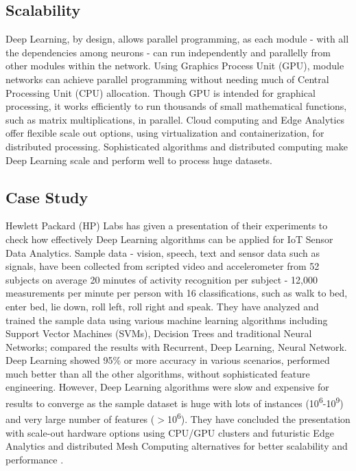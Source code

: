 \documentclass[sigconf]{acmart}
\begin{document}
	\subsection{Scalability}
	
	Deep Learning, by design, allows parallel programming, as each module - with all the dependencies among neurons - can run independently and parallelly from other modules within the network. Using Graphics Process Unit (GPU), module networks can achieve parallel programming without needing much of Central Processing Unit (CPU) allocation. Though GPU is intended for graphical processing, it works efficiently to run thousands of small mathematical functions, such as matrix multiplications, in parallel. Cloud computing and Edge Analytics offer flexible scale out options, using virtualization and containerization, for distributed processing. Sophisticated algorithms and distributed computing make Deep Learning scale and perform well to process huge datasets. 
	
	\subsection{Case Study}
	
	Hewlett Packard (HP) Labs has given a presentation of their experiments to check how effectively Deep Learning algorithms can be applied for IoT Sensor Data Analytics. Sample data - vision, speech, text and sensor data such as signals, have been collected from scripted video and accelerometer from 52 subjects on average 20 minutes of activity recognition per subject - 12,000 measurements per minute per person with 16 classifications, such as walk to bed, enter bed, lie down, roll left, roll right and speak. They have analyzed and trained the sample data using various machine learning algorithms including Support Vector Machines (SVMs), Decision Trees and traditional Neural Networks; compared the results with Recurrent, Deep Learning, Neural Network. Deep Learning showed 95\% or more accuracy in various scenarios, performed much better than all the other algorithms, without sophisticated feature engineering. However, Deep Learning algorithms were slow and expensive for results to converge as the sample dataset is huge with lots of instances (10\textsuperscript{6}-10\textsuperscript{9}) and very large number of features ($>$10\textsuperscript{6}). They have concluded the presentation with scale-out hardware options using CPU/GPU clusters and futuristic Edge Analytics and distributed Mesh Computing alternatives for better scalability and performance \cite{Vassilieva2016}. 
			
\end{document}
